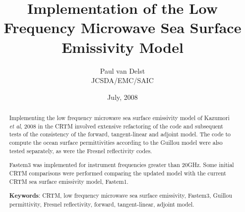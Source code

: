 



\newcommand{\rb}[1]{\raisebox{1.5ex}[0pt]{#1}}
\newcommand{\de}{\ensuremath{\delta\epsilon}}
\newcommand{\es}{\ensuremath{\epsilon_{s}}}
\newcommand{\einf}{\ensuremath{\epsilon_{\infty}}}
\newcommand{\eo}{\ensuremath{\epsilon_{0}}}
\newcommand{\twopnt}{\ensuremath{2\pi\nu\tau}}
\newcommand{\dstar}{\ensuremath{\delta^{*}\!}}

\title{Implementation of the Low Frequency Microwave Sea Surface Emissivity Model}
\author{Paul van Delst\\JCSDA/EMC/SAIC}
\date{July, 2008}



\maketitle


\begin{abstract}
Implementing the low frequency microwave sea surface emissivity model of Kazumori \textit{et al}, 2008\cite{Kazumori_etal_2008} in the CRTM involved extensive refactoring of the code and subsequent tests of the consistency of the forward, tangent-linear and adjoint model. The code to compute the ocean surface permittivities according to the Guillou\cite{Guillou_etal_1998} model were also tested separately, as were the Fresnel reflectivity codes.

Fastem3 was implemented for instrument frequencies greater than 20GHz. Some initial CRTM comparisons were performed comparing the updated model with the current CRTM sea surface emissivity model, Fastem1.

\textbf{Keywords}: CRTM, low frequency microwave sea surface emissivity, Fastem3, Guillou permittivity, Fresnel reflectivity, forward, tangent-linear, adjoint model.
\end{abstract}




